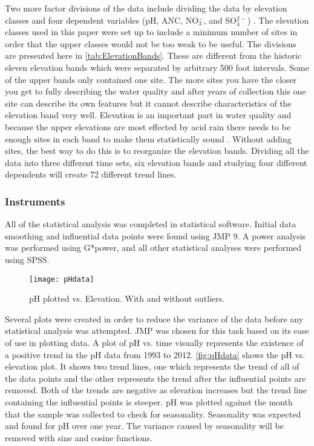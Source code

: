 
Two more factor divisions of the data include dividing the data by elevation classes and four dependent variables (pH, ANC, NO$_3^-$, and SO$_4^{2-}$) %
. 
The elevation classes used in this paper were set up to include a minimum number of sites in order that the upper classes would not be too weak to be useful. 
The divisions are presented here in \autoref{tab:ElevationBands}.  
These are different from the historic eleven elevation bands which were separated by arbitrary 500 foot intervals. Some of the upper bands only contained one site. 
The more sites you have the closer you get to fully describing the water quality and after years of collection this one site can describe its own features but it cannot describe characteristics of the elevation band very well. 
Elevation is an important part in water quality and because the upper elevations are most effected by acid rain there needs to be enough sites in each band to make them statistically sound \citep{weathers2006}. 
Without adding sites, the best way to do this is to reorganize the elevation bands. 
Dividing all the data into three different time sets, six elevation bands and studying four different dependents will create 72 different trend lines.

\subsubsection{Instruments}

All of the statistical analysis was completed in statistical software. 
Initial data smoothing and influential data points were found using JMP 9. 
A power analysis was performed using G*power, and all other statistical analyses were performed using SPSS.

\begin{figure}[h!]
\centering
  \texttt{[image: pHdata]}\\
  \caption{pH plotted vs. Elevation.  With and without outliers.}\label{fig:pHdata}
\end{figure}

Several plots were created in order to reduce the variance of the data before any statistical analysis was attempted. 
JMP was chosen for this task based on its ease of use in plotting data. A plot of pH vs. time visually represents the existence of a positive trend in the pH data from 1993 to 2012.
\autoref{fig:pHdata} shows the pH vs. elevation plot. 
It shows two trend lines, one which represents the trend of all of the data points and the other represents the trend after the influential points are removed. 
Both of the trends are negative as elevation increases but the trend line containing the influential points is steeper. pH was plotted against the month that the sample was collected to check for seasonality. 
Seasonality was expected and found for pH over one year. 
The variance caused by seasonality will be removed with sine and cosine functions.

